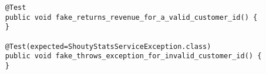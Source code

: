 \begin{verbatim}
    @Test
    public void fake_returns_revenue_for_a_valid_customer_id() {
    }
    
    @Test(expected=ShoutyStatsServiceException.class)
    public void fake_throws_exception_for_invalid_customer_id() {
    }
\end{verbatim}
